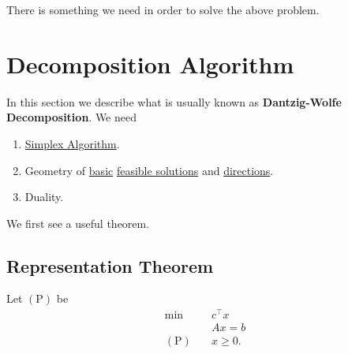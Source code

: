 There is something we need in order to solve the above problem.

\section{Decomposition Algorithm}
In this section we describe what is usually known as \textbf{Dantzig-Wolfe Decomposition}. We need
\begin{enumerate}
	\item \hyperref[algo:simplex-algorithm]{Simplex Algorithm}.
	\item Geometry of \hyperref[def:basic-solution]{basic} \hyperref[def:feasible-solution]{feasible solutions} and \hyperref[def:basic-direction]{directions}.
	\item Duality.
\end{enumerate}

We first see a useful theorem.
\subsection{Representation Theorem}
Let \((\mathrm{P})\) be
\[
	\begin{aligned}
		\min~             & c^{\top}x \\
		                  & Ax = b    \\
		(\mathrm{P})\quad & x\geq 0.
	\end{aligned}
\]

